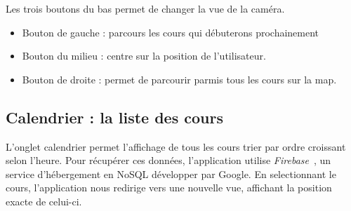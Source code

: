 \documentclass{article}
\begin{document}
Les trois boutons du bas permet de changer la vue de la caméra.

\begin{itemize}
    \item Bouton de gauche : parcours les cours qui débuterons prochainement

    \item Bouton du milieu : centre sur la position de l'utilisateur.

    \item Bouton de droite : permet de parcourir parmis tous les cours sur la map.
\end{itemize}



\newpage %



\subsection{Calendrier : la liste des cours}

L'onglet calendrier permet l'affichage de tous les cours trier par ordre croissant selon l'heure. Pour récupérer ces
données, l'application utilise \textit{Firebase}~\cite{firebaseDoc}, un service d'hébergement en NoSQL
développer par Google. En selectionnant le cours, l'application nous redirige vers une nouvelle vue,
affichant la position exacte de celui-ci.

\vspace{10pt}   %
\end{document}
